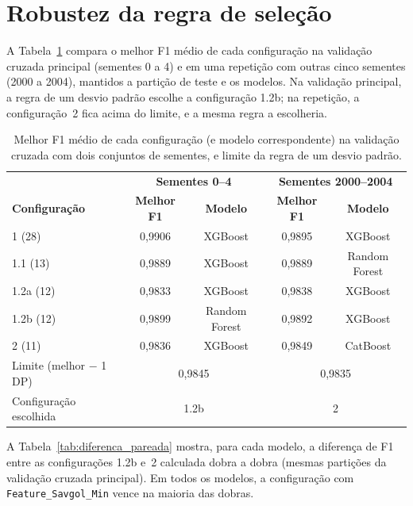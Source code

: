 \section{Robustez da regra de seleção}
\label{sec:robustez_selecao}

A Tabela~\ref{tab:robustez_selecao} compara o melhor F1 médio de cada configuração na validação cruzada principal (sementes 0 a 4) e em uma repetição com outras cinco sementes (2000 a 2004), mantidos a partição de teste e os modelos. Na validação principal, a regra de um desvio padrão escolhe a configuração 1.2b; na repetição, a configuração~2 fica acima do limite, e a mesma regra a escolheria.

\begin{table}[htbp]
\centering
\caption{Melhor F1 médio de cada configuração (e modelo correspondente) na validação cruzada com dois conjuntos de sementes, e limite da regra de um desvio padrão.}
\label{tab:robustez_selecao}
\footnotesize
\begin{tabular}{lcccc}
\hline
 & \multicolumn{2}{c}{\textbf{Sementes 0--4}} & \multicolumn{2}{c}{\textbf{Sementes 2000--2004}} \\
\textbf{Configuração} & \textbf{Melhor F1} & \textbf{Modelo} & \textbf{Melhor F1} & \textbf{Modelo} \\
\hline
1 (28) & 0{,}9906 & XGBoost & 0{,}9895 & XGBoost \\
1.1 (13) & 0{,}9889 & XGBoost & 0{,}9889 & Random Forest \\
1.2a (12) & 0{,}9833 & XGBoost & 0{,}9838 & XGBoost \\
1.2b (12) & 0{,}9899 & Random Forest & 0{,}9892 & XGBoost \\
2 (11) & 0{,}9836 & XGBoost & 0{,}9849 & CatBoost \\
\hline
Limite (melhor $-$ 1 DP) & \multicolumn{2}{c}{0{,}9845} & \multicolumn{2}{c}{0{,}9835} \\
Configuração escolhida & \multicolumn{2}{c}{1.2b} & \multicolumn{2}{c}{2} \\
\hline
\end{tabular}
\end{table}

A Tabela~\ref{tab:diferenca_pareada} mostra, para cada modelo, a diferença de F1 entre as configurações 1.2b e~2 calculada dobra a dobra (mesmas partições da validação cruzada principal). Em todos os modelos, a configuração com \texttt{Feature\_Savgol\_Min} vence na maioria das dobras.


